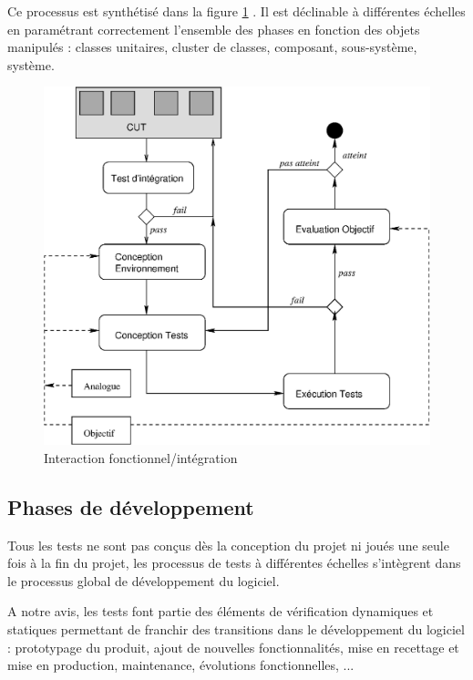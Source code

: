 Ce processus est synth\'etis\'e dans la figure 
\ref{fig-process-test}
  . Il est d\'eclinable \`a diff\'erentes
      \'echelles en param\'etrant correctement l'ensemble des phases en
      fonction des objets manipul\'es : classes unitaires, cluster de
      classes, composant, sous-syst\`eme, syst\`eme.
\par
  
\begin{figure}
\centering
\includegraphics{figures/fig-processtest.eps}
\caption{Interaction    fonctionnel/int\'egration}
\label{fig-process-test}
\end{figure}
 
\subsection{Phases de d\'eveloppement}
  
    Tous les tests ne sont pas con\c{c}us d\`es la conception du
    projet ni jou\'es une seule fois \`a la fin du projet, les
    processus de tests \`a diff\'erentes \'echelles s'int\`egrent
    dans le processus global de d\'eveloppement du logiciel. 
    
\par
  A notre avis, les tests font partie des \'el\'ements de
   v\'erification dynamiques et statiques permettant de franchir des
   transitions dans le d\'eveloppement du logiciel : prototypage du
   produit, ajout de nouvelles fonctionnalit\'es, mise en recettage
   et mise en production, maintenance, \'evolutions fonctionnelles,
   ...
   

